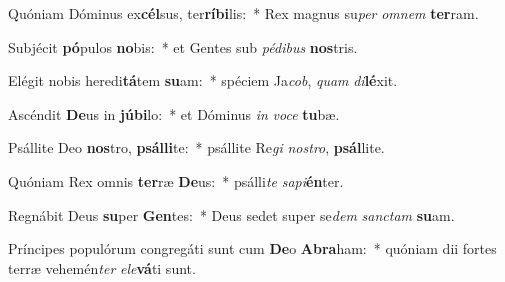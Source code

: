 \item Quóniam Dóminus ex\textbf{cél}sus, ter\textbf{rí}\textbf{bi}lis:~* Rex magnus su\textit{per} \textit{om}\textit{nem} \textbf{ter}ram.
\item Subjécit \textbf{pó}pulos \textbf{no}bis:~* et Gentes sub \textit{pé}\textit{di}\textit{bus} \textbf{nos}tris.
\item Elégit nobis heredi\textbf{tá}tem \textbf{su}am:~* spéciem Ja\textit{cob}, \textit{quam} \textit{di}\textbf{lé}xit.
\item Ascéndit \textbf{De}us in \textbf{jú}\textbf{bi}lo:~* et Dóminus \textit{in} \textit{vo}\textit{ce} \textbf{tu}bæ.
\item Psállite Deo \textbf{nos}tro, \textbf{psál}\textbf{li}te:~* psállite Re\textit{gi} \textit{nos}\textit{tro}, \textbf{psál}lite.
\item Quóniam Rex omnis \textbf{ter}ræ \textbf{De}us:~* psálli\textit{te} \textit{sa}\textit{pi}\textbf{én}ter.
\item Regnábit Deus \textbf{su}per \textbf{Gen}tes:~* Deus sedet super se\textit{dem} \textit{sanc}\textit{tam} \textbf{su}am.
\item Príncipes populórum congregáti sunt cum \textbf{De}o \textbf{A}\textbf{bra}ham:~* quóniam dii fortes terræ vehemén\textit{ter} \textit{e}\textit{le}\textbf{vá}ti sunt.
